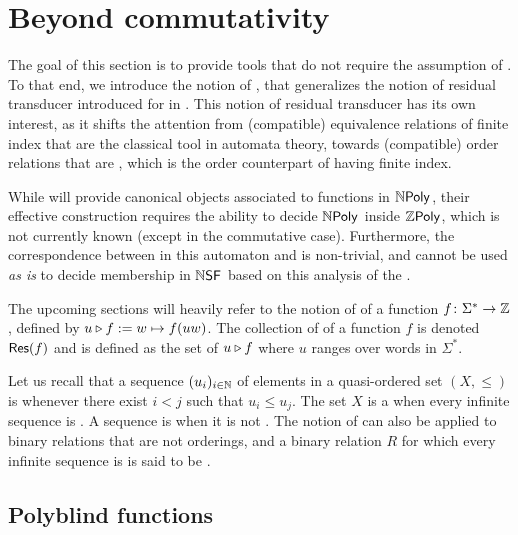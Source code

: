 \section{Beyond commutativity}
\label{beyond-commutative:sec}

The goal of this section is to provide tools that do not require the assumption
of . To that end, we introduce the notion of , that generalizes the notion of residual transducer introduced for
 in \cite{LOPEZ23b}. This notion of residual
transducer has its own interest, as it shifts the attention from (compatible)
equivalence relations of finite index that are the classical tool in automata
theory, towards (compatible) order relations that are ,
which is the order counterpart of having finite index.

While  will provide canonical objects associated
to functions in $\NPoly$, their effective construction requires the ability to
decide $\NPoly$ inside $\ZPoly$, which is not currently known (except in the
commutative case). Furthermore, the correspondence between  in
this automaton and  is non-trivial,
and cannot be used \emph{as is} to decide membership in $\NSF$
based on this analysis of the .

\AP The upcoming sections will heavily refer to the notion of  of
a function $f \colon \Sigma^* \to \Rel$,  defined by $\app{f}{u} \defined w
\mapsto f(uw)$. The collection of  of a function $f$ is
denoted $\Res(f)$ and is defined as the set of $\app{f}{u}$ where $u$ ranges
over words in $\Sigma^*$.

\AP Let us recall that a sequence $\seqof{u_i}{i \in \Nat}$ of elements in a
quasi-ordered set $(X, \leq)$ is  whenever there exist $i < j$ such
that $u_i \leq u_j$. The set $X$ is a  when every
infinite sequence is . A sequence is  when it is not
. The notion of  can also be applied to
binary relations that are not orderings, and a binary relation $R$ for which
every infinite sequence is  is said to be 
\cite{MELL98}.

\subsection{Polyblind functions}

